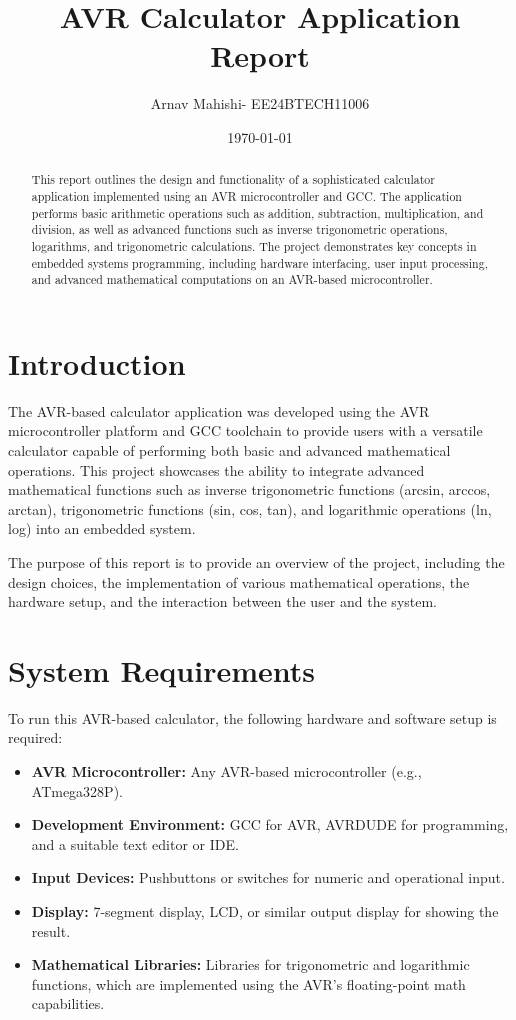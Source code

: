 \documentclass[12pt]{article}
\title{AVR Calculator Application Report}
\author{Arnav Mahishi- EE24BTECH11006}
\date{\today}
\begin{document}
\maketitle

\begin{abstract}
    This report outlines the design and functionality of a sophisticated calculator application implemented using an AVR microcontroller and GCC. The application performs basic arithmetic operations such as addition, subtraction, multiplication, and division, as well as advanced functions such as inverse trigonometric operations, logarithms, and trigonometric calculations. The project demonstrates key concepts in embedded systems programming, including hardware interfacing, user input processing, and advanced mathematical computations on an AVR-based microcontroller.
\end{abstract}

\tableofcontents
\newpage

\section{Introduction}
The AVR-based calculator application was developed using the AVR microcontroller platform and GCC toolchain to provide users with a versatile calculator capable of performing both basic and advanced mathematical operations. This project showcases the ability to integrate advanced mathematical functions such as inverse trigonometric functions (arcsin, arccos, arctan), trigonometric functions (sin, cos, tan), and logarithmic operations (ln, log) into an embedded system.

The purpose of this report is to provide an overview of the project, including the design choices, the implementation of various mathematical operations, the hardware setup, and the interaction between the user and the system. 

\section{System Requirements}
To run this AVR-based calculator, the following hardware and software setup is required:
\begin{itemize}
    \item \textbf{AVR Microcontroller:} Any AVR-based microcontroller (e.g., ATmega328P).
    \item \textbf{Development Environment:} GCC for AVR, AVRDUDE for programming, and a suitable text editor or IDE.
    \item \textbf{Input Devices:} Pushbuttons or switches for numeric and operational input.
    \item \textbf{Display:} 7-segment display, LCD, or similar output display for showing the result.
    \item \textbf{Mathematical Libraries:} Libraries for trigonometric and logarithmic functions, which are implemented using the AVR's floating-point math capabilities.
\end{itemize}
\end{document}

